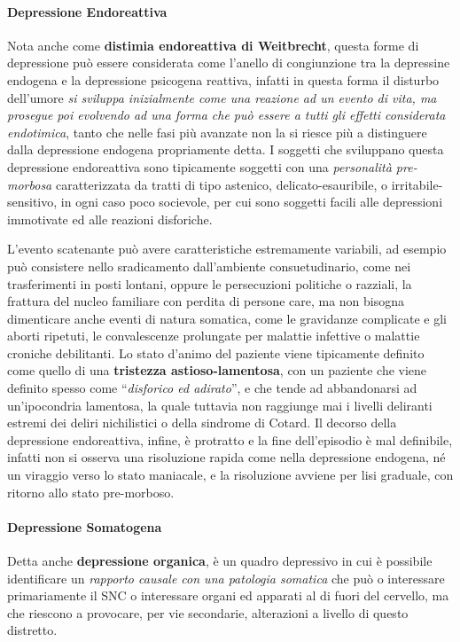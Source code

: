 \paragraph{Depressione Endoreattiva}

Nota anche come \textbf{distimia endoreattiva di Weitbrecht}, questa
forme di depressione può essere considerata come l'anello di
congiunzione tra la depressine endogena e la depressione psicogena
reattiva, infatti in questa forma il disturbo dell'umore \emph{si
sviluppa inizialmente come una reazione ad un evento di vita, ma
prosegue poi evolvendo ad una forma che può essere a tutti gli effetti
considerata endotimica}, tanto che nelle fasi più avanzate non la si
riesce più a distinguere dalla depressione endogena propriamente detta.
I soggetti che sviluppano questa depressione endoreattiva sono
tipicamente soggetti con una \emph{personalità pre-morbosa}
caratterizzata da tratti di tipo astenico, delicato-esauribile, o
irritabile-sensitivo, in ogni caso poco socievole, per cui sono soggetti
facili alle depressioni immotivate ed alle reazioni disforiche.

L'evento scatenante può avere caratteristiche estremamente variabili, ad
esempio può consistere nello sradicamento dall'ambiente consuetudinario,
come nei trasferimenti in posti lontani, oppure le persecuzioni
politiche o razziali, la frattura del nucleo familiare con perdita di
persone care, ma non bisogna dimenticare anche eventi di natura
somatica, come le gravidanze complicate e gli aborti ripetuti, le
convalescenze prolungate per malattie infettive o malattie croniche
debilitanti. Lo stato d'animo del paziente viene tipicamente definito
come quello di una \textbf{tristezza astioso-lamentosa}, con un paziente
che viene definito spesso come ``\emph{disforico ed adirato}'', e che
tende ad abbandonarsi ad un'ipocondria lamentosa, la quale tuttavia non
raggiunge mai i livelli deliranti estremi dei deliri nichilistici o
della sindrome di Cotard. Il decorso della depressione endoreattiva,
infine, è protratto e la fine dell'episodio è mal definibile, infatti
non si osserva una risoluzione rapida come nella depressione endogena,
né un viraggio verso lo stato maniacale, e la risoluzione avviene per
lisi graduale, con ritorno allo stato pre-morboso.

\paragraph{Depressione Somatogena}

Detta anche \textbf{depressione organica}, è un quadro depressivo in cui
è possibile identificare un \emph{rapporto causale con una patologia
somatica} che può o interessare primariamente il SNC o interessare
organi ed apparati al di fuori del cervello, ma che riescono a
provocare, per vie secondarie, alterazioni a livello di questo
distretto.


